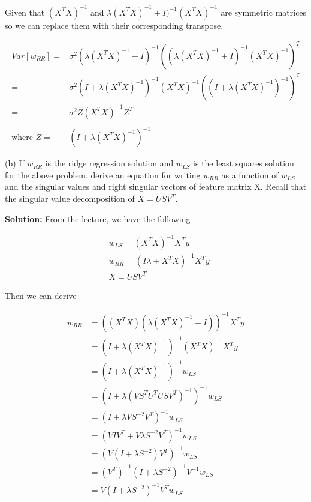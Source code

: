 \documentclass[11pt]{report}
\begin{document}
\justify
Given that  $(X^TX)^{-1}$ and $\lambda (X^TX)^{-1} + I)^{-1} (X^TX)^{-1}$ are symmetric matrices so we can replace them with their corresponding transpose. 

\begin{equation*}
\begin{split}
Var[w_{RR}] = &\sigma^2 (\lambda (X^TX)^{-1} + I)^{-1} ((\lambda (X^TX)^{-1} + I)^{-1} (X^TX)^{-1})^T \\
= &\sigma^2 (I + \lambda(X^TX)^{-1})^{-1}  (X^TX)^{-1} ((I + \lambda(X^TX)^{-1})^{-1})^T \\
= &\sigma^2 Z (X^TX)^{-1} Z^T \\
\\
\text{where } Z = &(I + \lambda (X^TX)^{-1})^{-1}
\end{split} 
\end{equation*}

\pagebreak

\justify
(b) If $w_{RR}$ is the ridge regression solution and $w_{LS}$ is the least squares solution for the above problem,
derive an equation for writing $w_{RR}$ as a function of $w_{LS}$ and the singular values and right singular vectors
of feature matrix X. Recall that the singular value decomposition of $X = USV^T$.

\justify
\textbf{Solution:} From the lecture, we have the following

\begin{align*}
&w_{LS} = (X^T X)^{-1} X^T y \\
&w_{RR} = (I \lambda + X^T X)^{-1} X^T y \\
&X = USV^T
\end{align*}

\justify
Then we can derive

\begin{equation*}
\begin{split}
w_{RR} &= ((X^TX) (\lambda (X^TX)^{-1} + I))^{-1} X^T y \\
&= (I + \lambda (X^TX)^{-1})^{-1} (X^TX)^{-1} X^T y \\
&= (I + \lambda (X^TX)^{-1})^{-1} w_{LS} \\
&= (I + \lambda (V S^T U^T U S V^T)^{-1})^{-1} w_{LS} \\
&= (I + \lambda V S^{-2} V^T)^{-1} w_{LS} \\
&= (V I V^T + V \lambda S^{-2} V^T)^{-1} w_{LS} \\
&= (V (I + \lambda S^{-2}) V^T )^{-1} w_{LS} \\
&= (V^T)^{-1} (I + \lambda S^{-2})^{-1} V^{-1}  w_{LS} \\
&= V (I + \lambda S^{-2})^{-1} V^T  w_{LS} \\
\end{split} 
\end{equation*}
\end{document}
